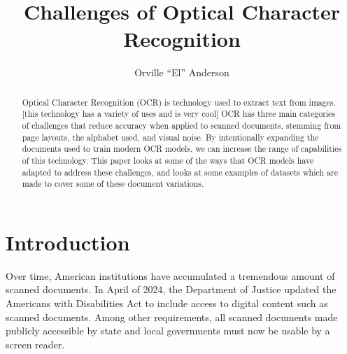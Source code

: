 \documentclass[sigplan,screen,nonacm]{acmart-tagged}
\begin{document}
\title{Challenges of Optical Character Recognition}
\author{Orville ``El'' Anderson}

\begin{abstract}
Optical Character Recognition (OCR) is technology used to extract text from images. 
[this technology has a variety of uses and is very cool]
OCR has three main categories of challenges that reduce accuracy when applied to scanned documents, stemming from page layouts, the alphabet used, and visual noise.
By intentionally expanding the documents used to train modern OCR models, we can increase the range of capabilities of this technology. 
This paper looks at some of the ways that OCR models have adapted to address these challenges, and looks at some examples of datasets which are made to cover some of these document variations.
\end{abstract}

\doclicenseThis



\maketitle

\section{Introduction}
\label{sec:introduction}

Over time, American institutions have accumulated a tremendous amount of scanned documents. 
In April of 2024, the Department of Justice updated the Americans with Disabilities Act to include access to digital content such as scanned documents. 
Among other requirements, all scanned documents made publicly accessible by state and local governments must now be usable by a screen reader.
\end{document}
